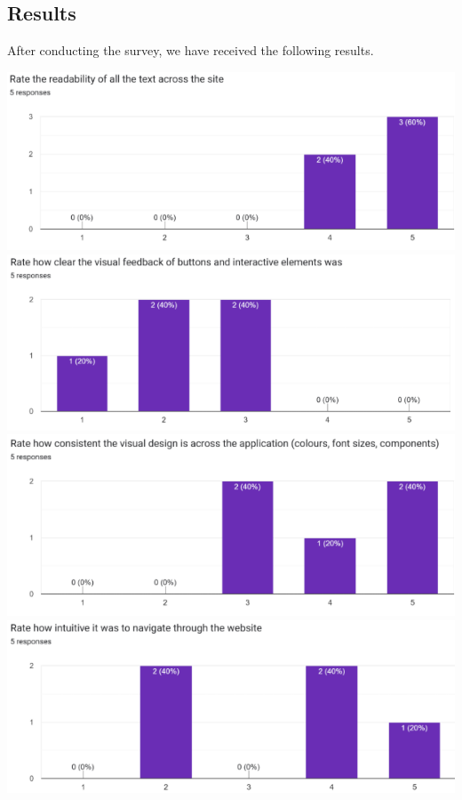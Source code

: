 \documentclass[12pt, titlepage]{article}
\begin{document}
\subsection{Results}
After conducting the survey, we have received the following results.
\begin{centering}
\includegraphics[scale=0.7]{chart (2).png}\\
\includegraphics[scale=0.7]{chart (3).png}\\
\includegraphics[scale=0.7]{chart (4).png}\\
\includegraphics[scale=0.7]{chart (5).png}\\

\end{centering}
\end{document}
